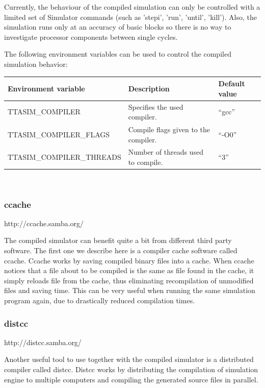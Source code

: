 \documentclass[a4paper,twoside]{tceusermanual}
\begin{document}
Currently, the behaviour of the compiled simulation can only be controlled with
a limited set of Simulator commands (such as 'stepi', 'run', 'until', 'kill').
Also, the simulation runs only at an accuracy of basic blocks so there 
is no way to investigate processor components between single cycles.

The following environment variables can be used to control the compiled
simulation behavior: \\

\begin{tabular}{p{}p{}
                p{}}
\textbf{Environment variable} &\textbf{Description} &\textbf{Default value} \\
\hline
TTASIM\_COMPILER & Specifies the used compiler. & ``gcc'' \\
TTASIM\_COMPILER\_FLAGS & Compile flags given to the compiler. & ``-O0'' \\
TTASIM\_COMPILER\_THREADS & Number of threads used to compile. & ``3'' \\

\end{tabular}\\


\subsubsection{ccache}
http://ccache.samba.org/

The compiled simulator can benefit quite a bit from different third party
software. The first one we describe here is a compiler cache software called
ccache. Ccache works by saving compiled binary files into a cache. When ccache
notices that a file about to be compiled is the same as file found in the
cache, it simply reloads file from the cache, thus eliminating recompilation
of unmodified files and saving time. This can be very useful when running the
same simulation program again, due to drastically reduced compilation times.

\subsubsection{distcc}
http://distcc.samba.org/

Another useful tool to use together with the compiled simulator is a
distributed compiler called distcc. Distcc works by distributing the 
compilation of simulation engine to multiple computers and compiling 
the generated source files in parallel.
\end{document}

